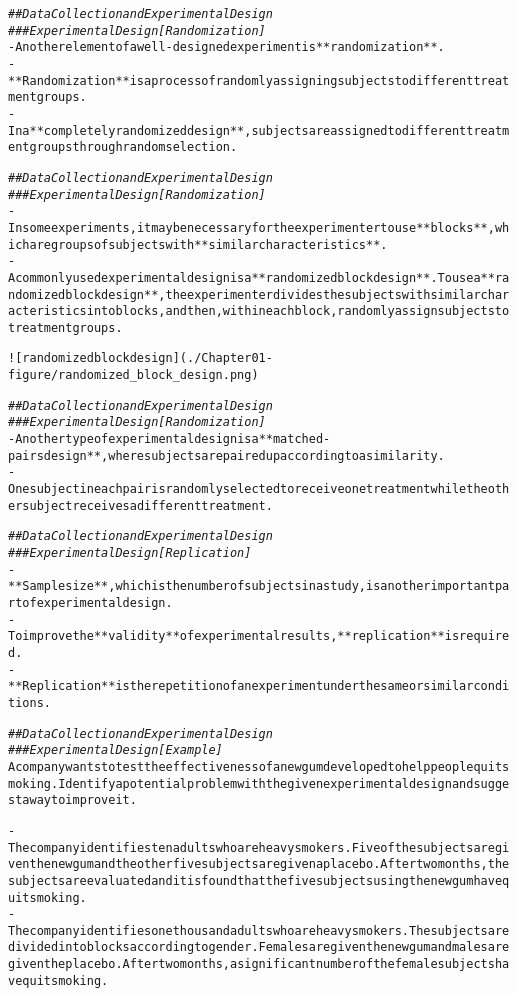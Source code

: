 \documentclass{article}\usepackage[]{graphicx}\usepackage[]{color}
\makeatletter
\newcommand{\hlcom}[1]{\textcolor[rgb]{0.678,0.584,0.686}{\textit{#1}}}%
\newenvironment{kframe}{%
 \def\at@end@of@kframe{}%
 \ifinner\ifhmode%
  \def\at@end@of@kframe{\end{minipage}}%
  \begin{minipage}{\columnwidth}%
 \fi\fi%
 \def\FrameCommand##1{\hskip\@totalleftmargin \hskip-\fboxsep
 \colorbox{shadecolor}{##1}\hskip-\fboxsep
     \hskip-\linewidth \hskip-\@totalleftmargin \hskip\columnwidth}%
 \MakeFramed {\advance\hsize-\width
   \@totalleftmargin\z@ \linewidth\hsize
   \@setminipage}}%
 {\par\unskip\endMakeFramed%
 \at@end@of@kframe}
\newenvironment{knitrout}{}{} %
\makeatother
\begin{document}
\begin{knitrout}
\begin{kframe}
\begin{alltt}
\hlcom{## Data Collection and Experimental Design}
\hlcom{### Experimental Design [Randomization]}
- Another element of a well-designed experiment is **randomization**. 
- **Randomization** is a process of randomly assigning subjects to different treatment groups.
- In a **completely randomized design**, subjects are assigned to different treatment groups through random selection.

\hlcom{## Data Collection and Experimental Design}
\hlcom{### Experimental Design [Randomization]}
- In some experiments, it may be necessary for the experimenter to use **blocks**, which are groups of subjects with **similar characteristics**.
- A commonly used experimental design is a **randomized block design**. To use a **randomized block design**, the experimenter divides the subjects with similar characteristics into blocks, and then, within each block, randomly assign subjects to treatment groups.

![randomized block design](./Chapter01-figure/randomized_block_design.png)

\hlcom{## Data Collection and Experimental Design}
\hlcom{### Experimental Design [Randomization]}
- Another type of experimental design is a **matched-pairs design**, where subjects are paired up according to a similarity. 
- One subject in each pair is randomly selected to receive one treatment while the other subject receives a different treatment.

\hlcom{## Data Collection and Experimental Design}
\hlcom{### Experimental Design [Replication]}
- **Sample size**, which is the number of subjects in a study, is another important part of experimental design. 
- To improve the **validity** of experimental results, **replication** is required.
- **Replication** is the repetition of an experiment under the same or similar conditions.

\hlcom{## Data Collection and Experimental Design}
\hlcom{### Experimental Design [Example]}
A company wants to test the effectiveness of a new gum developed to help people quit smoking. Identify a potential problem with the given experimental design and suggest a way to improve it.

- The company identifies ten adults who are heavy smokers. Five of the subjects are given the new gum and the other five subjects are given a placebo. After two months, the subjects are evaluated and it is found that the five subjects using the new gum have quit smoking.
- The company identifies one thousand adults who are heavy smokers. The subjects are divided into blocks according to gender. Females are given the new gum and males are given the placebo. After two months, a significant number of the female subjects have quit smoking.


\end{alltt}
\end{kframe}
\end{knitrout}
\end{document}
